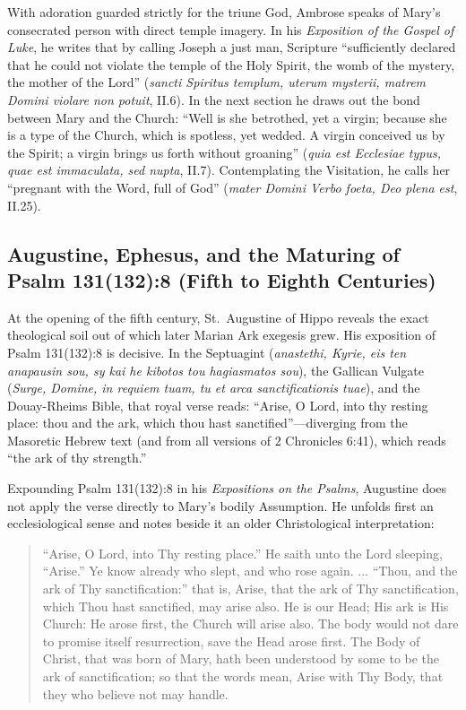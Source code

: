 With adoration guarded strictly for the triune God, Ambrose speaks of Mary's consecrated person with direct temple imagery. In his \textit{Exposition of the Gospel of Luke}, he writes that by calling Joseph a just man, Scripture ``sufficiently declared that he could not violate the temple of the Holy Spirit, the womb of the mystery, the mother of the Lord'' (\textit{sancti Spiritus templum, uterum mysterii, matrem Domini violare non potuit}, II.6). In the next section he draws out the bond between Mary and the Church: ``Well is she betrothed, yet a virgin; because she is a type of the Church, which is spotless, yet wedded. A virgin conceived us by the Spirit; a virgin brings us forth without groaning'' (\textit{quia est Ecclesiae typus, quae est immaculata, sed nupta}, II.7). Contemplating the Visitation, he calls her ``pregnant with the Word, full of God'' (\textit{mater Domini Verbo foeta, Deo plena est}, II.25).

\subsection{Augustine, Ephesus, and the Maturing of Psalm 131(132):8 (Fifth to Eighth Centuries)}

At the opening of the fifth century, St.\ Augustine of Hippo reveals the exact theological soil out of which later Marian Ark exegesis grew. His exposition of Psalm 131(132):8 is decisive. In the Septuagint (\textit{anastethi, Kyrie, eis ten anapausin sou, sy kai he kibotos tou hagiasmatos sou}), the Gallican Vulgate (\textit{Surge, Domine, in requiem tuam, tu et arca sanctificationis tuae}), and the Douay-Rheims Bible, that royal verse reads: ``Arise, O Lord, into thy resting place: thou and the ark, which thou hast sanctified''---diverging from the Masoretic Hebrew text (and from all versions of 2 Chronicles 6:41), which reads ``the ark of thy strength.''

Expounding Psalm 131(132):8 in his \textit{Expositions on the Psalms}, Augustine does not apply the verse directly to Mary's bodily Assumption. He unfolds first an ecclesiological sense and notes beside it an older Christological interpretation:

\begin{quote}\small
``Arise, O Lord, into Thy resting place.'' He saith unto the Lord sleeping, ``Arise.'' Ye know already who slept, and who rose again. ... ``Thou, and the ark of Thy sanctification:'' that is, Arise, that the ark of Thy sanctification, which Thou hast sanctified, may arise also. He is our Head; His ark is His Church: He arose first, the Church will arise also. The body would not dare to promise itself resurrection, save the Head arose first. The Body of Christ, that was born of Mary, hath been understood by some to be the ark of sanctification; so that the words mean, Arise with Thy Body, that they who believe not may handle.
\end{quote}

